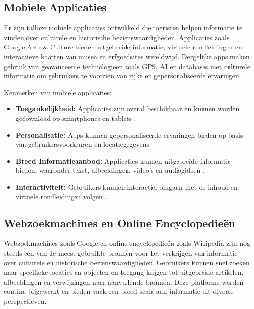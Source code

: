 \subsection{Mobiele Applicaties}
Er zijn talloze mobiele applicaties ontwikkeld die toeristen helpen informatie te vinden over culturele en historische bezienswaardigheden. Applicaties zoals Google Arts \& Culture bieden uitgebreide informatie, virtuele rondleidingen en interactieve kaarten van musea en erfgoedsites wereldwijd. Dergelijke apps maken gebruik van geavanceerde technologieën zoals GPS, AI en databases met culturele informatie om gebruikers te voorzien van rijke en gepersonaliseerde ervaringen.

Kenmerken van mobiele applicaties:
\begin{itemize}
    \item \textbf{Toegankelijkheid:} Applicaties zijn overal beschikbaar en kunnen worden gedownload op smartphones en tablets \autocite{morrison2012mobile}.
    \item \textbf{Personalisatie:} Apps kunnen gepersonaliseerde ervaringen bieden op basis van gebruikersvoorkeuren en locatiegegevens \autocite{kim2013empirical}.
    \item \textbf{Breed Informatieaanbod:} Applicaties kunnen uitgebreide informatie bieden, waaronder tekst, afbeeldingen, video's en audiogidsen \autocite{wa2015analysis}.
    \item \textbf{Interactiviteit:} Gebruikers kunnen interactief omgaan met de inhoud en virtuele rondleidingen volgen \autocite{jung2015role}.
\end{itemize}

\subsection{Webzoekmachines en Online Encyclopedieën}
Webzoekmachines zoals Google en online encyclopedieën zoals Wikipedia zijn nog steeds een van de meest gebruikte bronnen voor het verkrijgen van informatie over culturele en historische bezienswaardigheden. Gebruikers kunnen snel zoeken naar specifieke locaties en objecten en toegang krijgen tot uitgebreide artikelen, afbeeldingen en verwijzingen naar aanvullende bronnen. Deze platforms worden continu bijgewerkt en bieden vaak een breed scala aan informatie uit diverse perspectieven.

